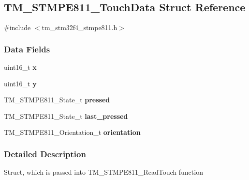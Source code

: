 \hypertarget{struct_t_m___s_t_m_p_e811___touch_data}{}\subsection{T\+M\+\_\+\+S\+T\+M\+P\+E811\+\_\+\+Touch\+Data Struct Reference}
\label{struct_t_m___s_t_m_p_e811___touch_data}


{\ttfamily \#include $<$tm\+\_\+stm32f4\+\_\+stmpe811.\+h$>$}

\subsubsection*{Data Fields}
\begin{DoxyCompactItemize}
\item 
\hypertarget{struct_t_m___s_t_m_p_e811___touch_data_a4dde988b1b2adba65ae3efa69f65d960}{}uint16\+\_\+t {\bfseries x}\label{struct_t_m___s_t_m_p_e811___touch_data_a4dde988b1b2adba65ae3efa69f65d960}

\item 
\hypertarget{struct_t_m___s_t_m_p_e811___touch_data_ab0580f504a7428539be299fa71565f30}{}uint16\+\_\+t {\bfseries y}\label{struct_t_m___s_t_m_p_e811___touch_data_ab0580f504a7428539be299fa71565f30}

\item 
\hypertarget{struct_t_m___s_t_m_p_e811___touch_data_a8a47f10a2772f8d1685926bf7a52defe}{}T\+M\+\_\+\+S\+T\+M\+P\+E811\+\_\+\+State\+\_\+t {\bfseries pressed}\label{struct_t_m___s_t_m_p_e811___touch_data_a8a47f10a2772f8d1685926bf7a52defe}

\item 
\hypertarget{struct_t_m___s_t_m_p_e811___touch_data_af2f04296e4b455eeeaf3e6a693d2c5ef}{}T\+M\+\_\+\+S\+T\+M\+P\+E811\+\_\+\+State\+\_\+t {\bfseries last\+\_\+pressed}\label{struct_t_m___s_t_m_p_e811___touch_data_af2f04296e4b455eeeaf3e6a693d2c5ef}

\item 
\hypertarget{struct_t_m___s_t_m_p_e811___touch_data_ad19731e19afc6a47f7100eeabc628223}{}T\+M\+\_\+\+S\+T\+M\+P\+E811\+\_\+\+Orientation\+\_\+t {\bfseries orientation}\label{struct_t_m___s_t_m_p_e811___touch_data_ad19731e19afc6a47f7100eeabc628223}

\end{DoxyCompactItemize}


\subsubsection{Detailed Description}
Struct, which is passed into T\+M\+\_\+\+S\+T\+M\+P\+E811\+\_\+\+Read\+Touch function

